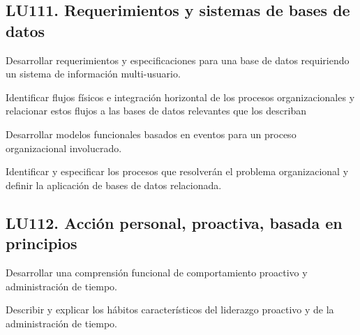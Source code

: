 \subsection{LU111. Requerimientos y sistemas de bases de datos}\label{sec:BOK-LU111}\label{sec:LU111}
\begin{LearningUnit}
\begin{LUGoal}
\item Desarrollar requerimientos y especificaciones para una base de datos requiriendo un sistema de información multi-usuario.
\end{LUGoal}

\begin{LUObjective}
\item Identificar flujos físicos e integración horizontal de los procesos organizacionales y relacionar estos flujos a las bases de datos relevantes que los describan
\item Desarrollar modelos funcionales basados en eventos para un proceso organizacional involucrado.
\item Identificar y especificar los procesos que resolverán el problema organizacional y definir la aplicación de bases de datos relacionada.
\end{LUObjective}
\end{LearningUnit}

\subsection{LU112. Acción personal, proactiva, basada en principios}\label{sec:BOK-LU112}\label{sec:LU112}
\begin{LearningUnit}
\begin{LUGoal}
\item Desarrollar una comprensión funcional de comportamiento proactivo y administración de tiempo.
\end{LUGoal}

\begin{LUObjective}
\item Describir y explicar los hábitos característicos del liderazgo proactivo y de la administración de tiempo.
\end{LUObjective}
\end{LearningUnit}

